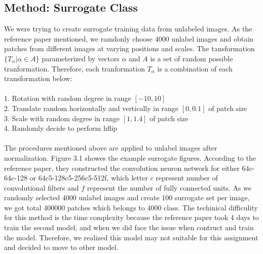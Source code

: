 \documentclass[final]{siamltexmm}
\begin{document}
\subsection{Method: Surrogate Class}
We were trying to create surrogate training data from unlabeled images. As the reference paper mentioned, we ramdonly choose 4000 unlabel images and obtain patches from different images at varying positions and scales. The tansformation $\{T_{\alpha}|\alpha \in A\}$ parameterized by vectors $\alpha$ and $A$ is a set of random possible tranformation. Therefore, each tranformation $T_{\alpha}$ is a combination of each transformation below:\\\\
1. Rotation with random degree in range $[-10, 10]$\\
2. Translate random horizontally and vertically in range $[0, 0.1]$ of patch size\\
3. Scale with random degree in range $[1, 1.4]$ of patch size\\
4. Randomly decide to perform hflip\\\\
The procedures mentioned above are applied to unlabel images after normalization. Figure 3.1 showes the example surrogate figures. According to the reference paper, they constructed the convolution neuron network for either 64c-64c-128 or 64c5-128c5-256c5-512f, which letter $c$ represent number of convolutional filters and $f$ represent the number of fully connected units. As we randomly selected 4000 unlabel images and create 100 surrogate set per image, we got total 400000 patches which belongs to 4000 class. The techinical difficulity for this method is the time complexity because the reference paper took 4 days to train the second model, and when we did face the issue when contruct and train the model. Therefore, we realized this model may not suitable for this assignment and decided to move to other model.
\end{document}
